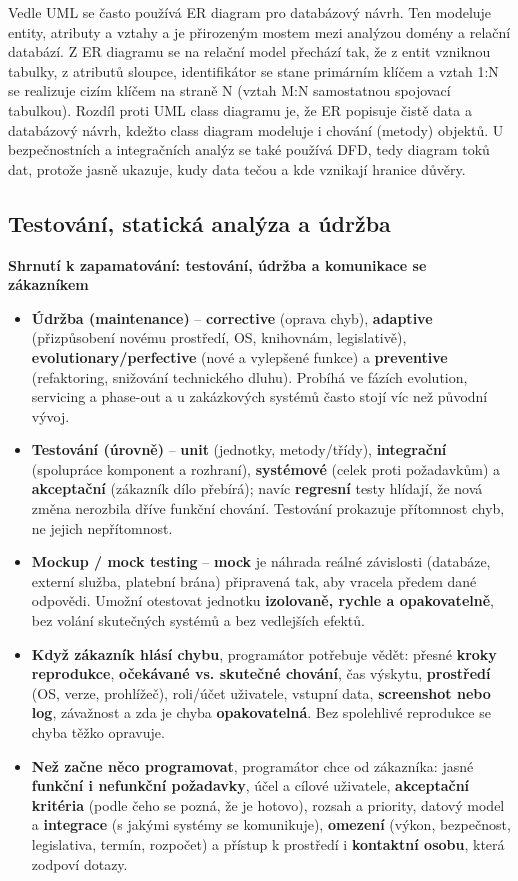 \documentclass[11pt,a4paper]{article}
\begin{document}
Vedle UML se často používá ER diagram pro databázový návrh. Ten modeluje entity, atributy a vztahy a je přirozeným mostem mezi analýzou domény a relační databází. Z ER diagramu se na relační model přechází tak, že z entit vzniknou tabulky, z atributů sloupce, identifikátor se stane primárním klíčem a vztah 1:N se realizuje cizím klíčem na straně N (vztah M:N samostatnou spojovací tabulkou). Rozdíl proti UML class diagramu je, že ER popisuje čistě data a databázový návrh, kdežto class diagram modeluje i chování (metody) objektů. U bezpečnostních a integračních analýz se také používá DFD, tedy diagram toků dat, protože jasně ukazuje, kudy data tečou a kde vznikají hranice důvěry.

\subsection*{Testování, statická analýza a údržba}

\begin{notebox}
\textbf{Shrnutí k zapamatování: testování, údržba a komunikace se zákazníkem}
\begin{itemize}
  \item \textbf{Údržba (maintenance)} -- \textbf{corrective} (oprava chyb), \textbf{adaptive} (přizpůsobení novému prostředí, OS, knihovnám, legislativě), \textbf{evolutionary/perfective} (nové a vylepšené funkce) a \textbf{preventive} (refaktoring, snižování technického dluhu). Probíhá ve fázích evolution, servicing a phase-out a u zakázkových systémů často stojí víc než původní vývoj.
  \item \textbf{Testování (úrovně)} -- \textbf{unit} (jednotky, metody/třídy), \textbf{integrační} (spolupráce komponent a rozhraní), \textbf{systémové} (celek proti požadavkům) a \textbf{akceptační} (zákazník dílo přebírá); navíc \textbf{regresní} testy hlídají, že nová změna nerozbila dříve funkční chování. Testování prokazuje přítomnost chyb, ne jejich nepřítomnost.
  \item \textbf{Mockup / mock testing} -- \textbf{mock} je náhrada reálné závislosti (databáze, externí služba, platební brána) připravená tak, aby vracela předem dané odpovědi. Umožní otestovat jednotku \textbf{izolovaně, rychle a opakovatelně}, bez volání skutečných systémů a bez vedlejších efektů.
  \item \textbf{Když zákazník hlásí chybu}, programátor potřebuje vědět: přesné \textbf{kroky reprodukce}, \textbf{očekávané vs. skutečné chování}, čas výskytu, \textbf{prostředí} (OS, verze, prohlížeč), roli/účet uživatele, vstupní data, \textbf{screenshot nebo log}, závažnost a zda je chyba \textbf{opakovatelná}. Bez spolehlivé reprodukce se chyba těžko opravuje.
  \item \textbf{Než začne něco programovat}, programátor chce od zákazníka: jasné \textbf{funkční i nefunkční požadavky}, účel a cílové uživatele, \textbf{akceptační kritéria} (podle čeho se pozná, že je hotovo), rozsah a priority, datový model a \textbf{integrace} (s jakými systémy se komunikuje), \textbf{omezení} (výkon, bezpečnost, legislativa, termín, rozpočet) a přístup k prostředí i \textbf{kontaktní osobu}, která zodpoví dotazy.
\end{itemize}
\end{notebox}
\end{document}
